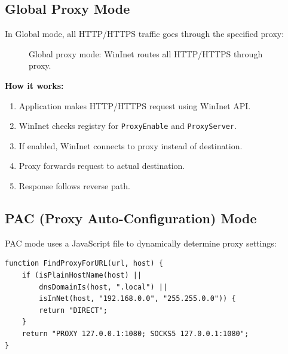 \subsection{Global Proxy Mode}

In Global mode, all HTTP/HTTPS traffic goes through the specified proxy:

\begin{figure}[h]
    \centering
    \caption{Global proxy mode: WinInet routes all HTTP/HTTPS through proxy.}
\end{figure}

\textbf{How it works:}
\begin{enumerate}
    \item Application makes HTTP/HTTPS request using WinInet API.
    \item WinInet checks registry for \texttt{ProxyEnable} and \texttt{ProxyServer}.
    \item If enabled, WinInet connects to proxy instead of destination.
    \item Proxy forwards request to actual destination.
    \item Response follows reverse path.
\end{enumerate}

\subsection{PAC (Proxy Auto-Configuration) Mode}

PAC mode uses a JavaScript file to dynamically determine proxy settings:

\begin{verbatim}
function FindProxyForURL(url, host) {
    if (isPlainHostName(host) || 
        dnsDomainIs(host, ".local") ||
        isInNet(host, "192.168.0.0", "255.255.0.0")) {
        return "DIRECT";
    }
    return "PROXY 127.0.0.1:1080; SOCKS5 127.0.0.1:1080";
}
\end{verbatim}

